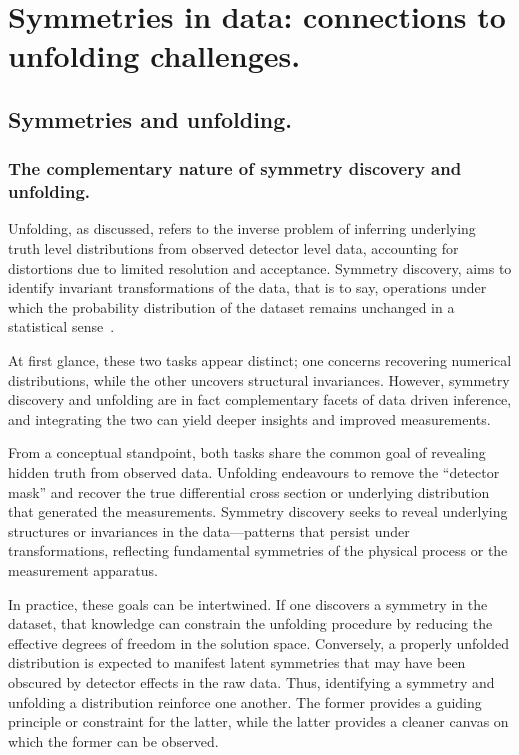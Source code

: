 \chapter{Symmetries in data: connections to unfolding challenges.}
\label{chap:symmetrygan}

\section{Symmetries and unfolding.}
    \subsection{The complementary nature of symmetry discovery and unfolding.}
        Unfolding, as discussed, refers to the inverse problem of inferring underlying truth level distributions from observed detector level data, accounting for distortions due to limited resolution and acceptance.
        Symmetry discovery, aims to identify invariant transformations of the data, that is to say, operations under which the probability distribution of the dataset remains unchanged in a statistical sense~\cite{shaw_lie_2025, shaw_symmetry_2024, hagemeyer_learning_2022}.
        
        At first glance, these two tasks appear distinct;
        one concerns recovering numerical distributions, while the other uncovers structural invariances.
        However, symmetry discovery and unfolding are in fact complementary facets of data driven inference, and integrating the two can yield deeper insights and improved measurements.
    
        From a conceptual standpoint, both tasks share the common goal of revealing hidden truth from observed data.
        Unfolding endeavours to remove the ``detector mask'' and recover the true differential cross section or underlying distribution that generated the measurements.
        Symmetry discovery seeks to reveal underlying structures or invariances in the data---patterns that persist under transformations, reflecting fundamental symmetries of the physical process or the measurement apparatus.
    
        In practice, these goals can be intertwined.
        If one discovers a symmetry in the dataset, that knowledge can constrain the unfolding procedure by reducing the effective degrees of freedom in the solution space.
        Conversely, a properly unfolded distribution is expected to manifest latent symmetries that may have been obscured by detector effects in the raw data.
        Thus, identifying a symmetry and unfolding a distribution reinforce one another.
        The former provides a guiding principle or constraint for the latter, while the latter provides a cleaner canvas on which the former can be observed.
    
